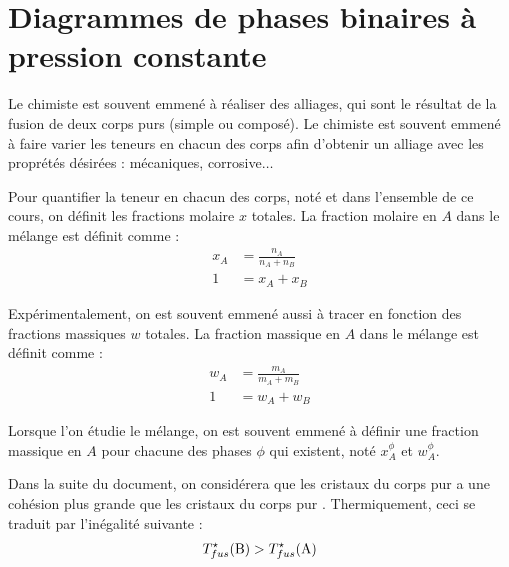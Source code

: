 \documentclass[a4paper]{book}
\begin{document}

\tableofcontents

\setcounter{chapter}{0}
\chapter{Diagrammes de phases binaires à pression constante}

Le chimiste est souvent emmené à réaliser des alliages, qui sont le résultat de la fusion de deux corps purs (simple ou composé). Le chimiste est souvent emmené à faire varier les teneurs en chacun des corps afin d'obtenir un alliage avec les proprétés désirées : mécaniques, corrosive$\ldots$

Pour quantifier la teneur en chacun des corps, noté  et  dans l'ensemble de ce cours, on définit les fractions molaire $x$ totales. La fraction molaire en $A$ dans le mélange est définit comme : 
\begin{align*}
x_A &= \frac{n_A}{n_A + n_B} \\
1 &= x_A + x_B
\end{align*}

Expérimentalement, on est souvent emmené aussi à tracer en fonction des fractions massiques $w$ totales. La fraction massique en $A$ dans le mélange est définit comme : 
\begin{align*}
w_A &= \frac{m_A}{m_A + m_B} \\
1 &= w_A + w_B
\end{align*}

Lorsque l'on étudie le mélange, on est souvent emmené à définir une fraction massique en $A$ pour chacune des phases $\phi$ qui existent, noté $x_A^\phi$ et $w_A^\phi$.

Dans la suite du document, on considérera que les cristaux du corps pur  a une cohésion plus grande que les cristaux du corps pur . Thermiquement, ceci se traduit par l'inégalité suivante :
\begin{align*}
T^\star_{fus} (\ce{B}) > T^\star_{fus} (\ce{A})
\end{align*}
\end{document}
